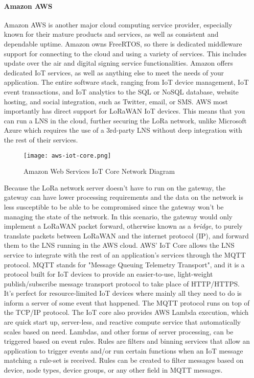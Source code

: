 \paragraph{Amazon AWS}
Amazon AWS is another major cloud computing service provider, especially known for their mature
products and services, as well as consistent and dependable uptime. Amazon owns FreeRTOS, so there
is dedicated middleware support for connecting to the cloud and using a variety of services. This
includes update over the air and digital signing service functionalities. Amazon offers dedicated
IoT services, as well as anything else to meet the needs of your application. The entire software
stack, ranging from IoT device management, IoT event transactions, and IoT analytics to the SQL or
NoSQL database, website hosting, and social integration, such as Twitter, email, or SMS. AWS most
importantly has direct support for LoRaWAN IoT devices. This means that you can run a LNS in the
cloud, further securing the LoRa network, unlike Microsoft Azure which requires the use of
a 3rd-party LNS without deep integration with the rest of their services. 

\begin{figure}
  \centering
  \texttt{[image: aws-iot-core.png]}
  \caption{Amazon Web Services IoT Core Network Diagram}
  \label{aws-iot-core}
\end{figure}

Because the LoRa network server doesn't have to run on the gateway, the gateway can have lower
processing requirements and the data on the network is less susceptible to be able to be compromised
since the gateway won't be managing the state of the network. In this scenario, the gateway would
only implement a LoRaWAN packet forward, otherwise known as a \emph{bridge}, to purely translate
packets between LoRaWAN and the internet protocol (IP), and forward them to the LNS running in the
AWS cloud. AWS' IoT Core allows the LNS service to integrate with the rest of an application's
services through the MQTT protocol. MQTT stands for "Message Queuing Telemetry Transport", and it is
a protocol built for IoT devices to provide an easier-to-use, light-weight publish/subscribe message
transport protocol to take place of HTTP/HTTPS. It's perfect for resource-limited IoT devices where
mainly all they need to do is inform a server of some event that happened. The MQTT protocol runs on
top of the TCP/IP protocol. The IoT core also provides AWS Lambda execution, which are quick start
up, server-less, and reactive compute service that automatically scales based on need. Lambdas, and
other forms of server processing, can be triggered based on event rules. Rules are filters and
binning services that allow an application to trigger events and/or run certain functions when an
IoT message matching a rule-set is received. Rules can be created to filter messages based on
device, node types, device groups, or any other field in MQTT messages.


